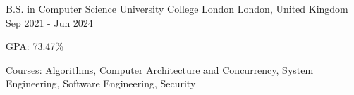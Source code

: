 
\begin{cventries}

  \cventry
    {B.S. in Computer Science} %
    {University College London} %
    {London, United Kingdom} %
    {Sep 2021 - Jun 2024}
    {
      \begin{cvitems} %
        \item {GPA: 73.47\%}
        \item {Courses: Algorithms, Computer Architecture and Concurrency, System Engineering, Software Engineering, Security}
      \end{cvitems}
    }

\end{cventries}
